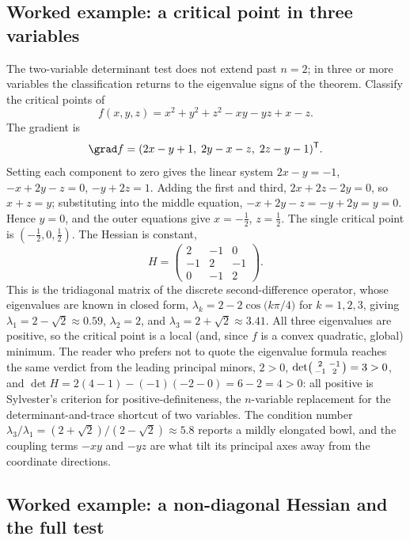 \subsection{Worked example: a critical point in three variables}

The two-variable determinant test does not extend past $n = 2$; in three
or more variables the classification returns to the eigenvalue signs of
the theorem. Classify the critical points of
\[
f(x, y, z) = x^{2} + y^{2} + z^{2} - x y - y z + x - z.
\]
The gradient is
\[
\grad f = (2 x - y + 1,\; 2 y - x - z,\; 2 z - y - 1)^{\mathsf{T}}.
\]
Setting each component to zero gives the linear system $2x - y = -1$,
$-x + 2y - z = 0$, $-y + 2z = 1$. Adding the first and third,
$2x + 2z - 2y = 0$, so $x + z = y$; substituting into the middle
equation, $-x + 2y - z = -y + 2y = y = 0$. Hence $y = 0$, and the outer
equations give $x = -\tfrac{1}{2}$, $z = \tfrac{1}{2}$. The single
critical point is $(-\tfrac{1}{2}, 0, \tfrac{1}{2})$. The Hessian is
constant,
\[
H = \begin{pmatrix} 2 & -1 & 0 \\ -1 & 2 & -1 \\ 0 & -1 & 2
\end{pmatrix}.
\]
This is the tridiagonal matrix of the discrete second-difference
operator, whose eigenvalues are known in closed form,
$\lambda_{k} = 2 - 2\cos\!\big(k\pi/4\big)$ for $k = 1, 2, 3$, giving
$\lambda_{1} = 2 - \sqrt{2} \approx 0.59$, $\lambda_{2} = 2$, and
$\lambda_{3} = 2 + \sqrt{2} \approx 3.41$. All three eigenvalues are
positive, so the critical point is a local (and, since $f$ is a convex
quadratic, global) minimum. The reader who prefers not to quote the
eigenvalue formula reaches the same verdict from the leading principal
minors, $2 > 0$, $\det\begin{psmallmatrix} 2 & -1 \\ -1 & 2
\end{psmallmatrix} = 3 > 0$, and $\det H = 2(4 - 1) - (-1)(-2 - 0) =
6 - 2 = 4 > 0$: all positive is Sylvester's criterion for
positive-definiteness, the $n$-variable replacement for the
determinant-and-trace shortcut of two variables. The condition number
$\lambda_{3}/\lambda_{1} = (2 + \sqrt 2)/(2 - \sqrt 2) \approx 5.8$
reports a mildly elongated bowl, and the coupling terms $-xy$ and $-yz$
are what tilt its principal axes away from the coordinate directions.

\subsection{Worked example: a non-diagonal Hessian and the full test}

